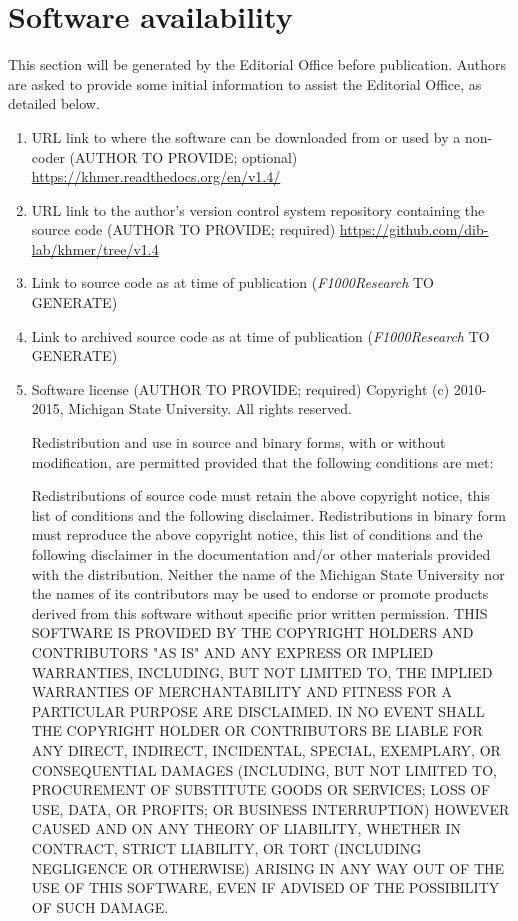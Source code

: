 \documentclass[10pt,a4paper,twocolumn]{article}
\begin{document}
\section*{Software availability}
This section will be generated by the Editorial Office before publication. Authors are asked to provide some initial information to assist the Editorial Office, as detailed below.
\begin{enumerate}
\item URL link to where the software can be downloaded from or used by a non-coder (AUTHOR TO PROVIDE; optional)
\url{https://khmer.readthedocs.org/en/v1.4/}
\item URL link to the author's version control system repository containing the source code
(AUTHOR TO PROVIDE; required)
\url{https://github.com/dib-lab/khmer/tree/v1.4}
\item Link to source code as at time of publication ({\textit{F1000Research}} TO GENERATE)
\item Link to archived source code as at time of publication ({\textit{F1000Research}} TO GENERATE)
\item Software license (AUTHOR TO PROVIDE; required)
Copyright (c) 2010-2015, Michigan State University. All rights reserved.

Redistribution and use in source and binary forms, with or without modification, are permitted provided that the following conditions are met:

Redistributions of source code must retain the above copyright notice, this list of conditions and the following disclaimer.
Redistributions in binary form must reproduce the above copyright notice, this list of conditions and the following disclaimer in the documentation and/or other materials provided with the distribution.
Neither the name of the Michigan State University nor the names of its contributors may be used to endorse or promote products derived from this software without specific prior written permission.
THIS SOFTWARE IS PROVIDED BY THE COPYRIGHT HOLDERS AND CONTRIBUTORS "AS IS" AND ANY EXPRESS OR IMPLIED WARRANTIES, INCLUDING, BUT NOT LIMITED TO, THE IMPLIED WARRANTIES OF MERCHANTABILITY AND FITNESS FOR A PARTICULAR PURPOSE ARE DISCLAIMED. IN NO EVENT SHALL THE COPYRIGHT HOLDER OR CONTRIBUTORS BE LIABLE FOR ANY DIRECT, INDIRECT, INCIDENTAL, SPECIAL, EXEMPLARY, OR CONSEQUENTIAL DAMAGES (INCLUDING, BUT NOT LIMITED TO, PROCUREMENT OF SUBSTITUTE GOODS OR SERVICES; LOSS OF USE, DATA, OR PROFITS; OR BUSINESS INTERRUPTION) HOWEVER CAUSED AND ON ANY THEORY OF LIABILITY, WHETHER IN CONTRACT, STRICT LIABILITY, OR TORT (INCLUDING NEGLIGENCE OR OTHERWISE) ARISING IN ANY WAY OUT OF THE USE OF THIS SOFTWARE, EVEN IF ADVISED OF THE POSSIBILITY OF SUCH DAMAGE.
\end{enumerate}
\end{document}
